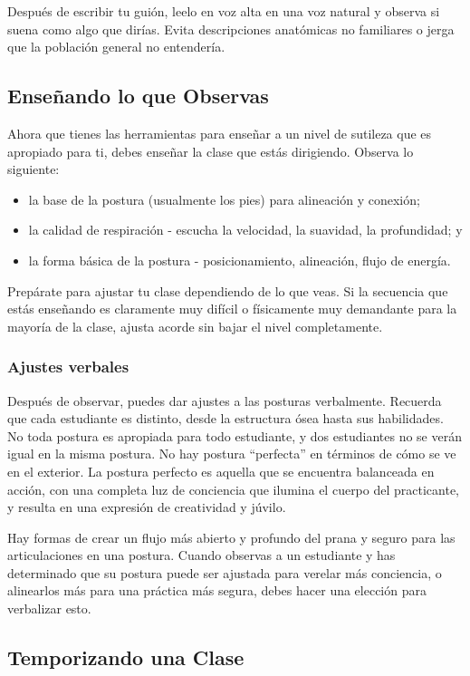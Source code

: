 Despu\'es de escribir tu guión, leelo en voz alta en una voz natural y observa si suena como algo que dirías. Evita descripciones anatómicas no familiares o jerga que la población general no entendería.

\subsection{Enseñando lo que Observas}
Ahora que tienes las herramientas para enseñar a un nivel de sutileza que es apropiado para ti, debes enseñar la clase que estás dirigiendo. Observa lo siguiente:

\begin{itemize}
	\item la base de la postura (usualmente los pies) para alineación y conexión;
	\item la calidad de respiración - escucha la velocidad, la suavidad, la profundidad; y
	\item la forma básica de la postura - posicionamiento, alineación, flujo de energía.
\end{itemize}

Prepárate para ajustar tu clase dependiendo de lo que veas. Si la secuencia que estás enseñando es claramente muy difícil o físicamente muy demandante para la mayoría de la clase, ajusta acorde sin bajar el nivel completamente.

\subsubsection{Ajustes verbales}
Despu\'es de observar, puedes dar ajustes a las posturas verbalmente. Recuerda que cada estudiante es distinto, desde la estructura ósea hasta sus habilidades. No toda postura es apropiada para todo estudiante, y dos estudiantes no se verán igual en la misma postura. No hay postura ``perfecta'' en t\'erminos de cómo se ve en el exterior. La postura perfecto es aquella que se encuentra balanceada en acción, con una completa luz de conciencia que ilumina el cuerpo del practicante, y resulta en una expresión de creatividad y júvilo.

Hay formas de crear un flujo más abierto y profundo del prana y seguro para las articulaciones en una postura. Cuando observas a un estudiante y has determinado que su postura puede ser ajustada para verelar más conciencia, o alinearlos más para una práctica más segura, debes hacer una elección para verbalizar esto.


\subsection{Temporizando una Clase}

